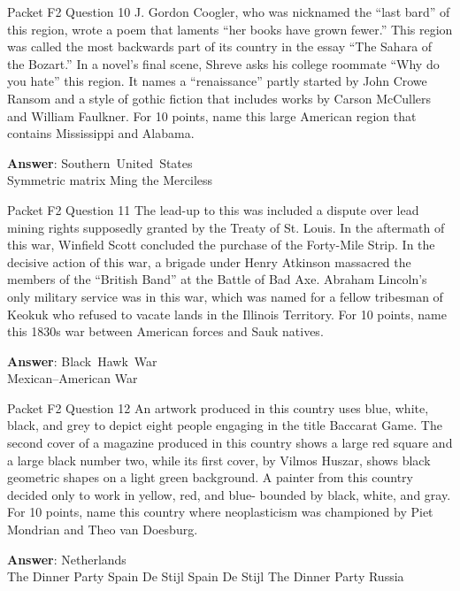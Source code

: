 \begin{frame}{Packet F2 Question 10}
J.   Gordon Coogler, who was nicknamed the “last   bard” of this region, wrote a poem that laments “her books have grown fewer.” This region was called the most backwards part of its country in the essay “The Sahara of the Bozart.” In a novel’s final     scene, Shreve asks   his college roommate “Why do you hate” this region. It names a “renaissance” partly started by John Crowe Ransom and a style of gothic fiction that includes works by Carson McCullers and William Faulkner. For 10 points, name this large American region that   contains Mississippi and Alabama.

\textbf{Answer}: Southern\ United\ States\\
 Symmetric matrix
 Ming the Merciless
\end{frame}

\begin{frame}{Packet F2 Question 11}
The lead-up to this was included a dispute over lead mining rights supposedly granted by the Treaty of St. Louis. In the aftermath of this war, Winfield Scott concluded   the purchase of the Forty-Mile Strip. In the decisive action of this war, a brigade under Henry Atkinson massacred the members of the   “British Band” at the   Battle of Bad Axe. Abraham Lincoln’s   only military service was in this war, which was named for a fellow tribesman of Keokuk who refused   to vacate lands in the Illinois Territory. For 10 points, name this 1830s war between American forces and Sauk natives.

\textbf{Answer}: Black\ Hawk\ War\\
 Mexican–American War
\end{frame}

\begin{frame}{Packet F2 Question 12}
An artwork produced in   this country uses blue, white, black, and grey to depict eight people engaging in the title Baccarat Game. The second cover of a magazine produced in this country shows a large red square and a large black number two, while its first cover, by Vilmos Huszar, shows black geometric shapes on a light green background. A painter from this country decided only to work in yellow, red,   and blue- bounded by black, white, and gray. For 10 points, name this country where neoplasticism was championed by Piet Mondrian and Theo   van Doesburg.        

\textbf{Answer}: Netherlands\\
 The Dinner Party
 Spain
 De Stijl
 Spain
 De Stijl
 The Dinner Party
 Russia
\end{frame}

